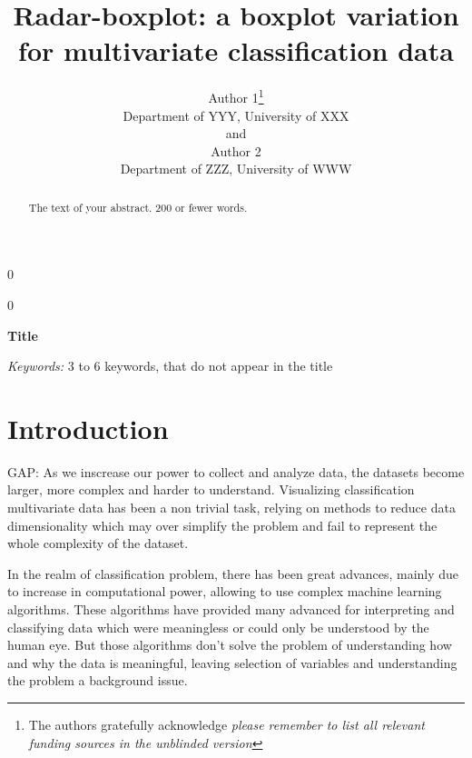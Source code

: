 \documentclass[12pt]{article}
\newcommand{\blind}{0}
\newcommand{\thetitle}{%
Radar-boxplot: a boxplot variation for multivariate classification data%
}
\begin{document}
%

\def\spacingset#1{\renewcommand{\baselinestretch}%
{#1}\small\normalsize} \spacingset{1}



\blind
{
  \title{\bf \thetitle}
\author{Author 1\thanks{
    The authors gratefully acknowledge \textit{please remember to list all relevant funding sources in the unblinded version}}\hspace{.2cm}\\
    Department of YYY, University of XXX\\
    and \\
    Author 2 \\
    Department of ZZZ, University of WWW}
  \maketitle
} \fi
\blind
{
  \bigskip
  \bigskip
  \bigskip
  \begin{center}
    {\LARGE\bf Title}
\end{center}
  \medskip
} \fi

\bigskip
\begin{abstract}
  The text of your abstract.  200 or fewer words.
\end{abstract}
\noindent%
{\it Keywords:}  3 to 6 keywords, that do not appear in the title
\vfill

\newpage
\spacingset{1.45} %

\section{Introduction}
\label{sec:intro}
GAP: As we inscrease our power to collect and analyze data, the datasets become larger, more complex and harder to understand. Visualizing classification multivariate data has been a non trivial task, relying on methods to reduce data dimensionality which may over simplify the problem and fail to represent the whole complexity of the dataset. 

In the realm of classification problem, there has been great advances, mainly due to increase in computational power, allowing to use complex machine learning algorithms. These algorithms have provided many advanced for interpreting and classifying data which were meaningless or could only be understood by the human eye. But those algorithms don't solve the problem of understanding how and why the data is meaningful, leaving selection of variables and understanding the problem a background issue. 
\end{document}
